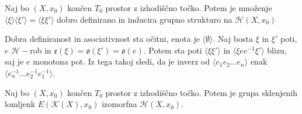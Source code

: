 \documentclass[mat1]{fmfdelo}
\DeclareRobustCommand{\h}{
    \mathcal{H}}
\begin{document}
\begin{izrek}
Naj bo $(X,x_0)$ končen $T_0$ prostor z izhodiščno točko. Potem je množenje $\langle\xi\rangle\langle\xi'\rangle=\langle\xi\xi'\rangle$ dobro definirano in inducira grupno strukturo na $\mathscr{H}(X,x_0)$
\end{izrek}

\begin{dokaz}
Dobra definiranost in asociativnost sta očitni, enota je $\langle\emptyset\rangle$. Naj bosta $\xi$ in $\xi'$ poti, $e$ $\h-$rob in $\mathfrak{e}(\xi)=\mathfrak{o}(\xi')=\mathfrak{o}(e)$. Potem sta poti $\langle\xi \xi'\rangle$ in $\langle\xi e e^{-1} \xi'\rangle$ blizu, saj je $e$ monotona pot. Iz tega takoj sledi, da je inverz od $\langle e_1 e_2...e_n\rangle$ enak $\langle e_n^{-1}...e_2^{-1}e_1^{-1}\rangle$.
\end{dokaz}


\begin{izrek}
Naj bo $(X,x_0)$ končen $T_0$ prostor z izhodiščno točko. Potem je grupa sklenjenih lomljenk $E(\mathcal{K}(X),x_0)$ izomorfna $\mathscr{H}(X,x_0)$.
\end{izrek}
\end{document}
